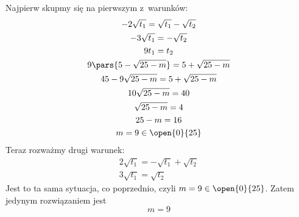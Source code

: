 Najpierw skupmy się na pierwszym z~warunków:
\begin{gather*}
    -2\sqrt{t_1} = \sqrt{t_1} - \sqrt{t_2}\\
    -3\sqrt{t_1} = -\sqrt{t_2}\\
    9t_1 = t_2\\
    9\pars{5 - \sqrt{25 - m}} = 5 + \sqrt{25 - m}\\
    45 - 9\sqrt{25 - m} = 5 + \sqrt{25 - m}\\
    10\sqrt{25 - m} = 40\\
    \sqrt{25 - m} = 4\\
    25 - m = 16\\
    m = 9 \in \open{0}{25}
\end{gather*}
Teraz rozważmy drugi warunek:
\begin{gather*}
    2\sqrt{t_1} = -\sqrt{t_1} + \sqrt{t_2}\\
    3\sqrt{t_1} = \sqrt{t_2}
\end{gather*}
Jest to ta sama sytuacja, co poprzednio, czyli \(m = 9 \in \open{0}{25}\). Zatem jedynym rozwiązaniem jest
\begin{equation*}
    m = 9
\end{equation*}
